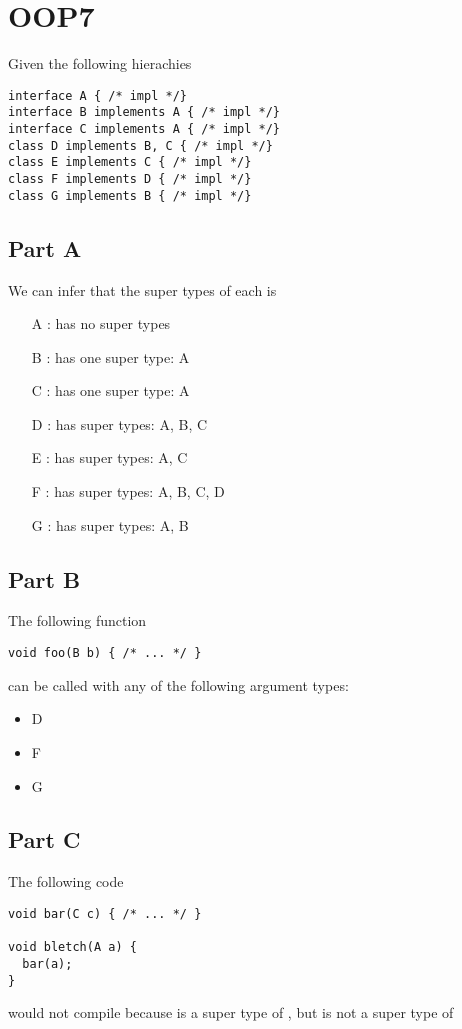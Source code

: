 \section*{OOP7}
Given the following hierachies
\begin{verbatim}
interface A { /* impl */}
interface B implements A { /* impl */}
interface C implements A { /* impl */}
class D implements B, C { /* impl */}
class E implements C { /* impl */}
class F implements D { /* impl */}
class G implements B { /* impl */}
\end{verbatim}
\subsection*{Part A}
We can infer that the super types of each is
\begin{enumerate}
  \item[A]: has no super types
  \item[B]: has one super type: A
  \item[C]: has one super type: A
  \item[D]: has super types: A, B, C
  \item[E]: has super types: A, C
  \item[F]: has super types: A, B, C, D
  \item[G]: has super types: A, B
\end{enumerate}
\subsection*{Part B}
The following function
\begin{verbatim}
void foo(B b) { /* ... */ }
\end{verbatim}
\noindent
can be called with any of the following argument types:
\begin{itemize}
  \item D
  \item F
  \item G
\end{itemize}

\subsection*{Part C}
The following code
\begin{verbatim}
void bar(C c) { /* ... */ }

void bletch(A a) {
  bar(a);
}
\end{verbatim}
\noindent
would not compile because  is a super type of ,
but  is not a super type of 

